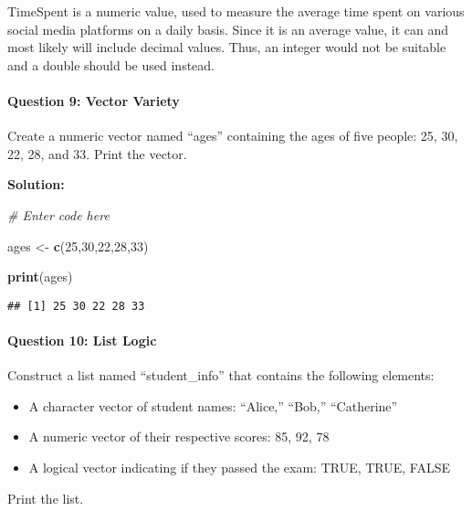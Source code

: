 \documentclass[
]{article}
\newenvironment{Shaded}{\begin{snugshade}}{\end{snugshade}}
\newcommand{\CommentTok}[1]{\textcolor[rgb]{0.56,0.35,0.01}{\textit{#1}}}
\newcommand{\DecValTok}[1]{\textcolor[rgb]{0.00,0.00,0.81}{#1}}
\newcommand{\FunctionTok}[1]{\textcolor[rgb]{0.13,0.29,0.53}{\textbf{#1}}}
\newcommand{\NormalTok}[1]{#1}
\newcommand{\OtherTok}[1]{\textcolor[rgb]{0.56,0.35,0.01}{#1}}
\begin{document}
TimeSpent is a numeric value, used to measure the average time spent on
various social media platforms on a daily basis. Since it is an average
value, it can and most likely will include decimal values. Thus, an
integer would not be suitable and a double should be used instead.

\hypertarget{question-9-vector-variety}{%
\paragraph{Question 9: Vector Variety}\label{question-9-vector-variety}}

Create a numeric vector named ``ages'' containing the ages of five
people: 25, 30, 22, 28, and 33. Print the vector.

\textbf{Solution:}

\begin{Shaded}
\begin{Highlighting}[]
\CommentTok{\# Enter code here}

\NormalTok{ages }\OtherTok{\textless{}{-}} \FunctionTok{c}\NormalTok{(}\DecValTok{25}\NormalTok{,}\DecValTok{30}\NormalTok{,}\DecValTok{22}\NormalTok{,}\DecValTok{28}\NormalTok{,}\DecValTok{33}\NormalTok{)}

\FunctionTok{print}\NormalTok{(ages)}
\end{Highlighting}
\end{Shaded}

\begin{verbatim}
## [1] 25 30 22 28 33
\end{verbatim}

\hypertarget{question-10-list-logic}{%
\paragraph{Question 10: List Logic}\label{question-10-list-logic}}

Construct a list named ``student\_info'' that contains the following
elements:

\begin{itemize}
\item
  A character vector of student names: ``Alice,'' ``Bob,'' ``Catherine''
\item
  A numeric vector of their respective scores: 85, 92, 78
\item
  A logical vector indicating if they passed the exam: TRUE, TRUE, FALSE
\end{itemize}

Print the list.
\end{document}
